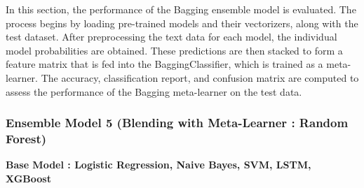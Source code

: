 \noindent
In this section, the performance of the Bagging ensemble model is evaluated. The process begins by loading pre-trained models and their vectorizers, along with the test dataset. After preprocessing the text data for each model, the individual model probabilities are obtained. These predictions are then stacked to form a feature matrix that is fed into the BaggingClassifier, which is trained as a meta-learner. The accuracy, classification report, and confusion matrix are computed to assess the performance of the Bagging meta-learner on the test data.


\subsubsection{Ensemble Model 5 (Blending with Meta-Learner : Random Forest)}

\textbf{Base Model : Logistic Regression, Naive Bayes, SVM, LSTM, XGBoost}

